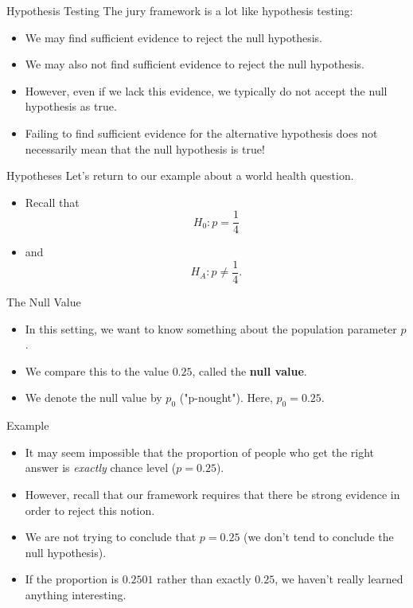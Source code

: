 \begin{frame}{Hypothesis Testing}
    The jury framework is a lot like hypothesis testing:
    \begin{itemize}
        \item We may find sufficient evidence to reject the null hypothesis.
        \item We may also not find sufficient evidence to reject the null hypothesis.
        \item However, even if we lack this evidence, we typically do not accept the null hypothesis as true. 
        \item Failing to find sufficient evidence for the alternative hypothesis does not necessarily mean that the null hypothesis is true!
    \end{itemize}
\end{frame}

\begin{frame}{Hypotheses}
    Let's return to our example about a world health question.  
    \begin{itemize}
        \item Recall that
        \[
            H_0: p = \frac{1}{4}
        \]
        \item and
        \[
            H_A: p \ne \frac{1}{4}.
        \]
    \end{itemize}
\end{frame}

\begin{frame}{The Null Value}
    \begin{itemize}
        \item In this setting, we want to know something about the population parameter $p$. 
        \item We compare this to the value $0.25$, called the \textbf{null value}.
        \item We denote the null value by $p_0$ ("p-nought"). Here, $p_0=0.25$.
    \end{itemize}
\end{frame}

\begin{frame}{Example}
    \begin{itemize}
        \item It may seem impossible that the proportion of people who get the right answer is \textit{exactly} chance level ($p=0.25$).
        \item However, recall that our framework requires that there be strong evidence in order to reject this notion.
        \item We are not trying to conclude that $p=0.25$ (we don't tend to conclude the null hypothesis).
        \item If the proportion is $0.2501$ rather than exactly $0.25$, we haven't really learned anything interesting.
    \end{itemize}
\end{frame}

